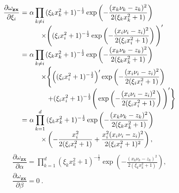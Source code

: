 \documentclass[conference]{IEEEtran}
\begin{document}
	\begin{equation*}
		\begin{array}{rcl}
			\displaystyle\dfrac{\partial\omega_\mathbf{zx}}{\partial\xi_i}&\hspace{-2.4mm}=&\hspace{-2.4mm}
			\displaystyle\alpha \prod_{k\neq i}{(\xi_kx_{k}^2+1)^{-\frac{1}{2}}}\exp\left(-\frac{(x_{k}\nu_k-z_{k})^2}{2(\xi_kx_{k}^2+1)}\right)\\
			&&\displaystyle\quad\times\Bigg({(\xi_ix_{i}^2+1)^{-\frac{1}{2}}}\exp\left(-\frac{(x_{i}\nu_i-z_{i})^2}{2(\xi_ix_{i}^2+1)}\right)\Bigg)^\prime \\
			&\hspace{-2.4mm}=&\hspace{-2.4mm}\displaystyle\alpha \prod_{k\neq i}{(\xi_kx_{k}^2+1)^{-\frac{1}{2}}}\exp\left(-\frac{(x_{k}\nu_k-z_{k})^2}{2(\xi_kx_{k}^2+1)}\right)\\
			&&\displaystyle\quad\times\Bigg\{\Big({(\xi_ix_{i}^2+1)^{-\frac{1}{2}}}\Big)^\prime\exp\left(-\frac{(x_{i}\nu_i-z_{i})^2}{2(\xi_ix_{i}^2+1)}\right)\\
			&&\displaystyle\qquad+{(\xi_ix_{i}^2+1)^{-\frac{1}{2}}}\Bigg (\exp\left(-\frac{(x_{i}\nu_i-z_{i})^2}{2(\xi_ix_{i}^2+1)}\right)\Bigg)^\prime\Bigg\} \\
			&\hspace{-2.4mm}=&\hspace{-2.4mm}\displaystyle\alpha \prod^d_{k=1}{(\xi_kx_{k}^2+1)^{-\frac{1}{2}}}\exp\left(-\frac{(x_{k}\nu_k-z_{k})^2}{2(\xi_kx_{k}^2+1)}\right)\\
			&&\displaystyle\quad\times\left(-\dfrac{x_{i}^2}{2(\xi_ix_{i}^2+1)}+\dfrac{x_{i}^2(x_{i}\nu_i-z_{i})^2}{2(\xi_ix_{i}^2+1)^2}\right) ,
		\end{array}
	\end{equation*}
	\begin{equation*}
	\begin{array}{l}
	\displaystyle\dfrac{\partial\omega_\mathbf{zx}}{\partial \alpha}= \prod_{k=1}^{d}{(\xi_kx_{k}^2+1)^{-\frac{1}{2}}}\exp\left(-\frac{(x_{k}\nu_k-z_{k})^2}{2(\xi_kx_{k}^2+1)}\right) ,\\
	\displaystyle\dfrac{\partial\omega_\mathbf{zx}}{\partial \beta}=0\ .
	\end{array}
	\end{equation*}
\end{document}
